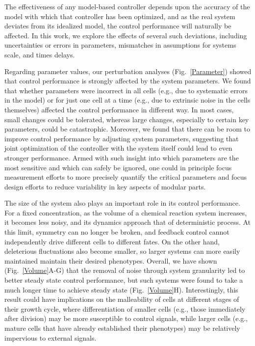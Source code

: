 \documentclass[12pt]{iopart}
\begin{document}
The effectiveness of any model-based controller depends upon the accuracy of the model with which that controller has been optimized, and as the real system deviates from its idealized model, the control performance will naturally be affected. In this work, we explore the effects of several such deviations, including uncertainties or errors in parameters, mismatches in assumptions for systems scale, and times delays. 

Regarding parameter values, our perturbation analyses (Fig.\ \ref{Parameter}) showed that control performance is strongly affected by the system parameters. 
We found that whether parameters were incorrect in all cells (e.g., due to systematic errors in the model) or for just one cell at a time (e.g., due to extrinsic noise in the cells themselves) affected the control performance in different way. 
In most cases, small changes could be tolerated, whereas large changes, especially to certain key parameters, could be catastrophic. 
Moreover, we found that there can be room to improve control performance by adjusting system parameters, suggesting that joint optimization of the controller with the system itself could lead to even stronger performance.
Armed with such insight into which parameters are the most sensitive and which can safely be ignored, one could in principle focus measurement efforts to more precisely quantify the critical parameters and focus design efforts to reduce variability in key aspects of modular parts.

The size of the system also plays an important role in its control performance. 
For a fixed concentration, as the volume of a chemical reaction system increases, it becomes less noisy, and its dynamics approach that of deterministic process. 
At this limit, symmetry can no longer be broken, and feedback control cannot independently drive different cells to different fates.  
On the other hand, deleterious fluctuations also become smaller, so larger systems can more easily maintained maintain their desired phenotypes.
Overall, we have shown (Fig.\ \ref{Volume}A-G) that the removal of noise through system granularity led to better steady state control performance, but  such systems were found to take a much longer time to achieve steady state (Fig.\ \ref{Volume}H). 
Interestingly, this result could have implications on the malleability of cells at different stages of their growth cycle, where differentiation of smaller cells (e.g., those immediately after division) may be more susceptible to control signals, while larger cells (e.g., mature cells that have already established their phenotypes) may be relatively impervious to external signals.
\end{document}
